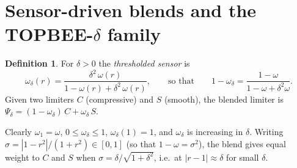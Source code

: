 \documentclass[11pt]{article}
\newcommand{\scheme}{TOPBEE-$\delta$}
\theoremstyle{plain}
\theoremstyle{definition}
\newtheorem{definition}[theorem]{Definition}
\begin{document}
\section{Sensor-driven blends and the \scheme{} family}\label{sec:family}
\begin{definition}
For $\delta>0$ the \emph{thresholded sensor} is
\begin{equation}\label{eq:omegadelta}
\omega_\delta(r)=\frac{\delta^2\,\omega(r)}{1-\omega(r)+\delta^2\,\omega(r)},\qquad\text{so that}\qquad 1-\omega_\delta=\frac{1-\omega}{1-\omega+\delta^2\omega}.
\end{equation}
Given two limiters $C$ (compressive) and $S$ (smooth), the blended limiter is $\Psi_\delta=(1-\omega_\delta)\,C+\omega_\delta\,S$.
\end{definition}
Clearly $\omega_1=\omega$, $0\le\omega_\delta\le1$, $\omega_\delta(1)=1$, and $\omega_\delta$ is increasing in $\delta$. Writing $\sigma=|1-r^2|/(1+r^2)\in[0,1]$ (so that $1-\omega=\sigma^2$), the blend gives equal weight to $C$ and $S$ when $\sigma=\delta/\sqrt{1+\delta^2}$, i.e.\ at $|r-1|\approx\delta$ for small $\delta$.
\end{document}
